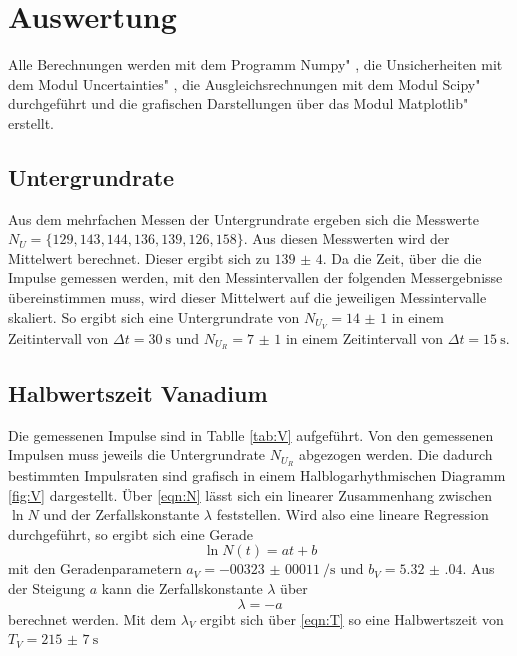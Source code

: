 \section{Auswertung}
\label{sec:Auswertung}

Alle Berechnungen werden mit dem Programm \glqq Numpy" \cite{numpy}, die Unsicherheiten mit dem Modul \glqq Uncertainties" \cite{uncertainties}, die Ausgleichsrechnungen mit dem Modul \glqq Scipy" \cite{scipy} durchgeführt und die grafischen Darstellungen über das Modul \glqq Matplotlib" \cite{matplotlib} erstellt.

\subsection{Untergrundrate}

Aus dem mehrfachen Messen der Untergrundrate ergeben sich die Messwerte $N_U=\{ 129, 143, 144, 136, 139, 126, 158 \}$. Aus diesen Messwerten wird der Mittelwert berechnet. Dieser ergibt sich zu $\num{139(4)}$. Da die Zeit, über die die Impulse gemessen werden, mit den Messintervallen der folgenden Messergebnisse übereinstimmen muss, wird  dieser Mittelwert auf die jeweiligen Messintervalle skaliert. So ergibt sich eine Untergrundrate von $N_{U_V}=\num{14(1)}$ in einem Zeitintervall von $\Delta t=\SI{30}{\s}$ und $N_{U_R}=\num{7(1)}$ in einem Zeitintervall von $\Delta t=\SI{15}{\s}$.

\subsection{Halbwertszeit Vanadium}
\label{Vanadium}

Die gemessenen Impulse sind in Tablle \ref{tab:V} aufgeführt. Von den gemessenen Impulsen muss jeweils die Untergrundrate $N_{U_R}$ abgezogen werden. Die dadurch bestimmten Impulsraten sind grafisch in einem Halblogarhythmischen Diagramm \ref{fig:V} dargestellt. Über \eqref{eqn:N} lässt sich ein linearer Zusammenhang zwischen $\ln{N}$ und der Zerfallskonstante $\lambda $ feststellen. Wird also eine lineare Regression durchgeführt, so ergibt sich eine Gerade
\begin{equation}
    \ln{N}(t)=at + b
    \label{eqn:gerade}
\end{equation}
mit den Geradenparametern $a_V=\SI[per-mode=reciprocal]{-00323(00011)}{\per\s}$ und $b_V=\num{5.32(04)}$. 
Aus der Steigung $a$ kann die Zerfallskonstante $\lambda$ über
\begin{equation}
    \lambda=-a
\label{eqn:lamb}
\end{equation}
berechnet werden. Mit dem $\lambda_V$ ergibt sich über \eqref{eqn:T} so eine Halbwertszeit von $T_V=\SI{215(7)}{\s}$


